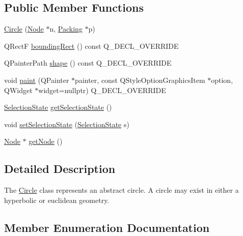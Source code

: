 \subsection*{Public Member Functions}
\begin{DoxyCompactItemize}
\item 
\hyperlink{class_circle_a868970e092a93d7b9f33e665a3f22380}{Circle} (\hyperlink{class_node}{Node} $\ast$n, \hyperlink{class_packing}{Packing} $\ast$p)
\item 
Q\+Rect\+F \hyperlink{class_circle_a00aab04a8e096d14a5a56ae1eb620275}{bounding\+Rect} () const Q\+\_\+\+D\+E\+C\+L\+\_\+\+O\+V\+E\+R\+R\+I\+D\+E
\item 
Q\+Painter\+Path \hyperlink{class_circle_a841007c456f5bc7be91b5901a7630ce3}{shape} () const Q\+\_\+\+D\+E\+C\+L\+\_\+\+O\+V\+E\+R\+R\+I\+D\+E
\item 
void \hyperlink{class_circle_a3adfe40ef373defa3e427072f00cc0a2}{paint} (Q\+Painter $\ast$painter, const Q\+Style\+Option\+Graphics\+Item $\ast$option, Q\+Widget $\ast$widget=nullptr) Q\+\_\+\+D\+E\+C\+L\+\_\+\+O\+V\+E\+R\+R\+I\+D\+E
\item 
\hyperlink{class_circle_abaea7f437ac8e5519b3a69bce0848140}{Selection\+State} \hyperlink{class_circle_af5a48f5fc296b4b84056febe3ce17a75}{get\+Selection\+State} ()
\item 
void \hyperlink{class_circle_a3a3ac6da7ed29a19f45c869b10be7a91}{set\+Selection\+State} (\hyperlink{class_circle_abaea7f437ac8e5519b3a69bce0848140}{Selection\+State} s)
\item 
\hyperlink{class_node}{Node} $\ast$ \hyperlink{class_circle_a22131e1f54de4142ed23e55902c2402c}{get\+Node} ()
\end{DoxyCompactItemize}


\subsection{Detailed Description}
The \hyperlink{class_circle}{Circle} class represents an abstract circle. A circle may exist in either a hyperbolic or euclidean geometry. 

\subsection{Member Enumeration Documentation}
\hypertarget{class_circle_abaea7f437ac8e5519b3a69bce0848140}{}
